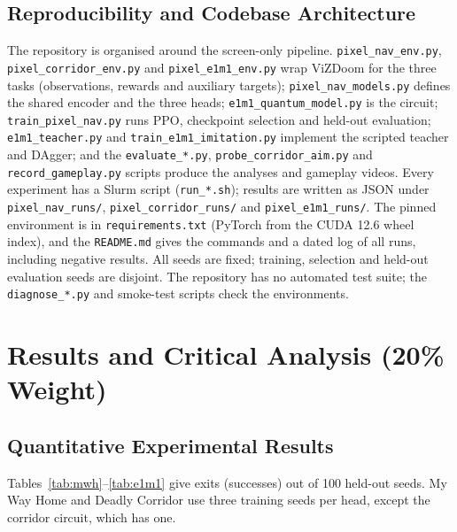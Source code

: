 \documentclass[10pt, a4paper]{article}
\begin{document}
\subsection{Reproducibility and Codebase Architecture}
The repository is organised around the screen-only pipeline. \texttt{pixel\_nav\_env.py}, \texttt{pixel\_corridor\_env.py} and \texttt{pixel\_e1m1\_env.py} wrap ViZDoom for the three tasks (observations, rewards and auxiliary targets); \texttt{pixel\_nav\_models.py} defines the shared encoder and the three heads; \texttt{e1m1\_quantum\_model.py} is the circuit; \texttt{train\_pixel\_nav.py} runs PPO, checkpoint selection and held-out evaluation; \texttt{e1m1\_teacher.py} and \texttt{train\_e1m1\_imitation.py} implement the scripted teacher and DAgger; and the \texttt{evaluate\_*.py}, \texttt{probe\_corridor\_aim.py} and \texttt{record\_gameplay.py} scripts produce the analyses and gameplay videos. Every experiment has a Slurm script (\texttt{run\_*.sh}); results are written as JSON under \texttt{pixel\_nav\_runs/}, \texttt{pixel\_corridor\_runs/} and \texttt{pixel\_e1m1\_runs/}. The pinned environment is in \texttt{requirements.txt} (PyTorch from the CUDA 12.6 wheel index), and the \texttt{README.md} gives the commands and a dated log of all runs, including negative results. All seeds are fixed; training, selection and held-out evaluation seeds are disjoint. The repository has no automated test suite; the \texttt{diagnose\_*.py} and smoke-test scripts check the environments.

\section{Results and Critical Analysis (20\% Weight)}
\label{sec:results_analysis}

\subsection{Quantitative Experimental Results}
Tables~\ref{tab:mwh}--\ref{tab:e1m1} give exits (successes) out of 100 held-out seeds. My Way Home and Deadly Corridor use three training seeds per head, except the corridor circuit, which has one.
\end{document}
